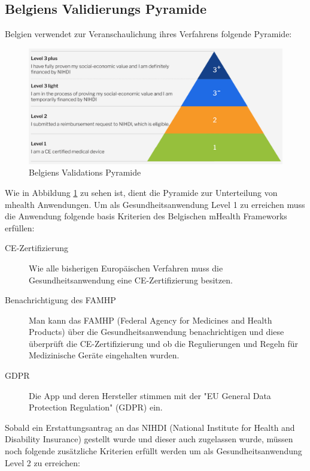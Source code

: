 \documentclass{article}
\begin{document}
		\subsection{Belgiens Validierungs Pyramide}
			Belgien verwendet zur Veranschaulichung ihres Verfahrens folgende Pyramide:\par
			\begin{figure}[htbp]
				\centering
				\includegraphics[width=\textwidth]{./grafiken/belgien_validation_pyramide}
				\caption[Belgiens Verfahren]{Belgiens Validations Pyramide}
				\label{belgien-validierung}
			\end{figure}
			Wie in Abbildung \ref{belgien-validierung} zu sehen ist, dient die Pyramide zur Unterteilung von mhealth Anwendungen.
			Um als Gesundheitsanwendung Level 1 zu erreichen muss die Anwendung folgende basis Kriterien des Belgischen mHealth Frameworks erfüllen:
			\begin{description}
				\item[CE-Zertifizierung] Wie alle bisherigen Europäischen Verfahren muss die Gesundheitsanwendung eine CE-Zertifizierung besitzen.
				\item[Benachrichtigung des FAMHP] Man kann das FAMHP (Federal Agency for Medicines and Health Products) über die Gesundheitsanwendung benachrichtigen und diese überprüft die CE-Zertifizierung und ob die Regulierungen und Regeln für Medizinische Geräte eingehalten wurden.    
				\item[GDPR] Die App und deren Hersteller stimmen mit der "EU General Data Protection Regulation" (GDPR) ein.
			\end{description}
			Sobald ein Erstattungsantrag an das NIHDI (National Institute for Health and Disability Insurance) gestellt wurde und dieser auch zugelassen wurde, müssen noch folgende zusätzliche Kriterien erfüllt werden um als Gesundheitsanwendung Level 2 zu erreichen:
\end{document}
